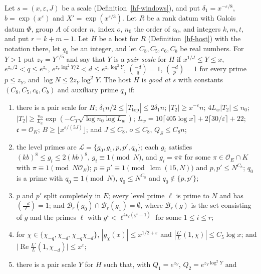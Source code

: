 \begin{definition}\label{hf-good-host}
Let $s=(x,\varepsilon,J)$ be a scale (Definition~\ref{hf-windows}), and put
$\delta_1=x^{-\varepsilon/8}$, $b=\exp(x^\varepsilon)$ and $X'=\exp(x^{\varepsilon/3})$. Let $R$ be a rank datum with Galois datum $\Phi$, group $A$ of order $n$, index $o$,
$n_0$ the order of $a_0$, and integers $k,m,t$, and put $r=k+m-1$. Let $H$ be a host for $R$
(Definition~\ref{hf-host}) with the notation there, let $q_0$ be an integer, and let
$C_8,C_5,c_6,C_b$ be real numbers. For $Y>1$ put $z_Y=Y^{\varepsilon/5}$ and say that $Y$ is a
\emph{pair scale} for $H$ if $x^{1/J}\leq Y\leq x$, $e^{z_Y/2}<q\leq e^{z_Y}$,
$e^{z_Y\log^2Y/2}<d\leq e^{z_Y\log^2Y}$, $\left(\frac{-d}{q}\right)=1$,
$\left(\frac{-d}{p}\right)=1$ for every prime $p\leq z_Y$, and $\log N\leq2z_Y\log^2Y$. The host
$H$ is \emph{good at} $s$ with constants $(C_8,C_5,c_6,C_b)$ and auxiliary prime $q_0$ if:
\begin{enumerate}
\item there is a pair scale for $H$; $\delta_1n/2\leq|T_{\mathrm{top}}|\leq2\delta_1n$;
  $|T_2|\geq x^{-\varepsilon}n$; $4L_w|T_2|\leq n_0$;
  $|T_2|\geq\frac{n_0}{L_w}\exp(-C_T\sqrt{\log n_0\log L_w})$;
  $L_w=10\lceil405\log x\rceil+2\lceil30/\varepsilon\rceil+22$; $\mathfrak c=\mathcal O_K$;
  $B\geq\lfloor x^{\varepsilon/(5J)}\rfloor$; and $J\leq C_8$, $o\leq C_8$, $Q_S\leq C_8n$;
\item the level primes are $\mathcal L=\{g_0,g_1,p,p',q_0\}$; each $g_i$ satisfies
  $(kb)^8\leq g_i\leq2(kb)^8$, $g_i\equiv1\pmod N$, and $g_i=\pi\bar\pi$ for some
  $\pi\in\mathcal O_E\cap K$ with $\pi\equiv1\pmod{N\mathcal O_E}$; $p\equiv p'\equiv1\pmod{\operatorname{lcm}(15,N)}$ and
  $p,p'\leq N^{C_8}$; $q_0$ is a prime with $q_0\equiv1\pmod N$, $q_0\leq N^{C_8}$ and
  $q_0\notin\{p,p'\}$;
\item $p$ and $p'$ split completely in $E$; every level prime $\ell$ is prime to $N$ and has
  $\left(\frac{-d}{\ell}\right)=1$; and $\mathcal B_r(g_0)\cap\mathcal B_r(g_1)=\emptyset$, where
  $\mathcal B_r(g)$ is the set consisting of $g$ and the primes $\ell$ with
  $g^i<\ell^{4v_\ell(g^i-1)}$ for some $1\leq i\leq r$;
\item for $\chi\in\{\chi_{-q},\chi_{-d},\chi_{-q}\chi_{-d}\}$, $|g_\chi(x)|\leq x^{1/2+\varepsilon}$
  and $\left|\frac{L'}{L}(1,\chi)\right|\leq C_5\log x$; and
  $\bigl|\operatorname{Re}\frac{L'}{L}(1,\chi_{-d})\bigr|\leq x^{\varepsilon}$;
\item there is a pair scale $Y$ for $H$ such that, with $Q_1=e^{z_Y}$, $Q_2=e^{z_Y\log^2Y}$ and

\end{enumerate}
\end{definition}
